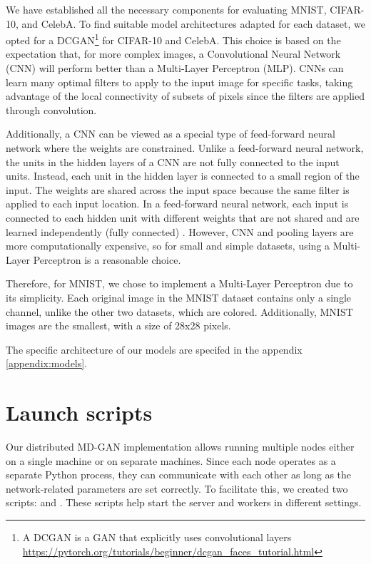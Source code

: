We have established all the necessary components for evaluating MNIST, CIFAR-10, and CelebA. To find suitable model architectures adapted for each dataset, we opted for a DCGAN\footnote{A DCGAN is a GAN that explicitly uses convolutional layers \url{https://pytorch.org/tutorials/beginner/dcgan_faces_tutorial.html}} for CIFAR-10 and CelebA. This choice is based on the expectation that, for more complex images, a Convolutional Neural Network (CNN) will perform better than a Multi-Layer Perceptron (MLP). CNNs can learn many optimal filters to apply to the input image for specific tasks, taking advantage of the local connectivity of subsets of pixels since the filters are applied through convolution.

Additionally, a CNN can be viewed as a special type of feed-forward neural network where the weights are constrained. Unlike a feed-forward neural network, the units in the hidden layers of a CNN are not fully connected to the input units. Instead, each unit in the hidden layer is connected to a small region of the input. The weights are shared across the input space because the same filter is applied to each input location. In a feed-forward neural network, each input is connected to each hidden unit with different weights that are not shared and are learned independently (fully connected) \cite{james2023introduction}. However, CNN and pooling layers are more computationally expensive, so for small and simple datasets, using a Multi-Layer Perceptron is a reasonable choice.


Therefore, for MNIST, we chose to implement a Multi-Layer Perceptron due to its simplicity. Each original image in the MNIST dataset contains only a single channel, unlike the other two datasets, which are colored. Additionally, MNIST images are the smallest, with a size of 28x28 pixels.

The specific architecture of our models are specifed in the appendix \ref{appendix:models}.


\section{Launch scripts}
Our distributed MD-GAN implementation allows running multiple nodes either on a single machine or on separate machines. Since each node operates as a separate Python process, they can communicate with each other as long as the network-related parameters are set correctly. To facilitate this, we created two scripts:  and . These scripts help start the server and workers in different settings.

